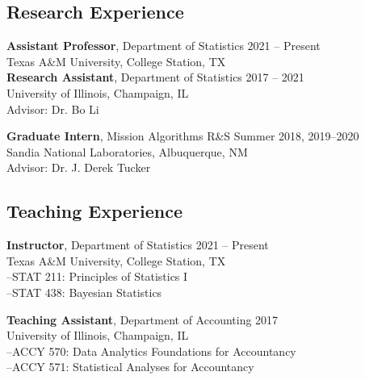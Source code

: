 \documentclass[11pt]{article}
\begin{document}
\subsection*{Research Experience}
\vspace{-0.6cm}\noindent\hrulefill
\vspace{0.2cm}

\noindent \textbf{Assistant Professor}, Department of Statistics \hfill 2021 -- Present \\
Texas A\&M University, College Station, TX \\

\noindent \textbf{Research Assistant}, Department of Statistics \hfill 2017 -- 2021 \\
University of Illinois, Champaign, IL \\
Advisor: Dr. Bo Li
\vspace{0.4cm}

\noindent \textbf{Graduate Intern}, Mission Algorithms R\&S \hfill Summer 2018, 2019--2020 \\
Sandia National Laboratories, Albuquerque, NM \\
Advisor: Dr. J. Derek Tucker


\subsection*{Teaching Experience}
\vspace{-0.6cm}\noindent\hrulefill
\vspace{0.1cm}

\noindent \textbf{Instructor}, Department of Statistics \hfill 2021 -- Present \\
Texas A\&M University, College Station, TX \vspace{0.1cm} \\
--STAT 211: Principles of Statistics I \\
--STAT 438: Bayesian Statistics
\vspace{0.4cm}

\noindent \textbf{Teaching Assistant}, Department of Accounting \hfill 2017 \\
University of Illinois, Champaign, IL \vspace{0.1cm} \\
--ACCY 570: Data Analytics Foundations for Accountancy \\
--ACCY 571: Statistical Analyses for Accountancy
\vspace{0.4cm}
\end{document}
